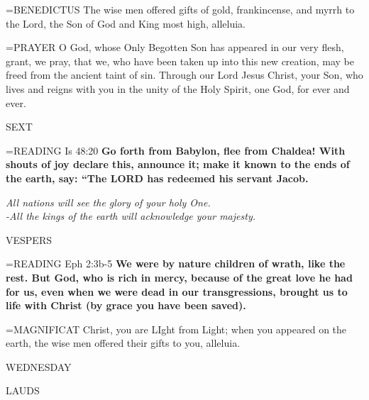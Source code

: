 \hangindent=\parindent \small{BENEDICTUS 	The wise men offered gifts of gold, frankincense, and myrrh to the Lord, the Son of God and King most high, alleluia.\\}

\hangindent=\parindent \small{PRAYER 	O God, whose Only Begotten Son has appeared in our very flesh, grant, we pray, that we, who have been taken up into this new creation, may be freed from the ancient taint of sin. Through our Lord Jesus Christ, your Son, who lives and reigns with you in the unity of the Holy Spirit, one God, for ever and ever.}

\begin{flushleft}\normalsize SEXT\\\end{flushleft}

\hangindent=\parindent \small{\uppercase{READING}}   Is 48:20 \textbf{  Go forth from Babylon, flee from Chaldea! With shouts of joy declare this, announce it; make it known to the ends of the earth, say: “The LORD has redeemed his servant Jacob.\\}

\begin{center}
\textit{All nations will see the glory of your holy One.\\
-All the kings of the earth will acknowledge your majesty.}
\end{center}

\begin{flushleft}\normalsize VESPERS\\\end{flushleft}

\hangindent=\parindent \small{\uppercase{READING}}   Eph 2:3b-5 \textbf{  We were by nature children of wrath, like the rest. But God, who is rich in mercy, because of the great love he had for us, even when we were dead in our transgressions, brought us to life with Christ (by grace you have been saved).\\}

\hangindent=\parindent \small{MAGNIFICAT 	Christ, you are LIght from Light; when you appeared on the earth, the wise men offered their gifts to you, alleluia.\\}

\begin{center}
\normalsize WEDNESDAY
\end{center}

\begin{flushleft}\normalsize LAUDS\\\end{flushleft}

